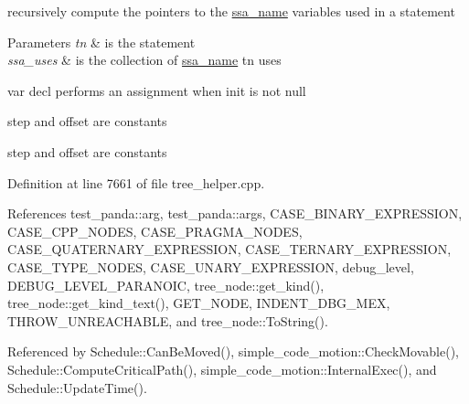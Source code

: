 recursively compute the pointers to the \hyperlink{structssa__name}{ssa\+\_\+name} variables used in a statement 


\begin{DoxyParams}{Parameters}
{\em tn} & is the statement \\
\hline
{\em ssa\+\_\+uses} & is the collection of \hyperlink{structssa__name}{ssa\+\_\+name} tn uses \\
\hline
\end{DoxyParams}
var decl performs an assignment when init is not null

step and offset are constants

step and offset are constants 

Definition at line 7661 of file tree\+\_\+helper.\+cpp.



References test\+\_\+panda\+::arg, test\+\_\+panda\+::args, C\+A\+S\+E\+\_\+\+B\+I\+N\+A\+R\+Y\+\_\+\+E\+X\+P\+R\+E\+S\+S\+I\+ON, C\+A\+S\+E\+\_\+\+C\+P\+P\+\_\+\+N\+O\+D\+ES, C\+A\+S\+E\+\_\+\+P\+R\+A\+G\+M\+A\+\_\+\+N\+O\+D\+ES, C\+A\+S\+E\+\_\+\+Q\+U\+A\+T\+E\+R\+N\+A\+R\+Y\+\_\+\+E\+X\+P\+R\+E\+S\+S\+I\+ON, C\+A\+S\+E\+\_\+\+T\+E\+R\+N\+A\+R\+Y\+\_\+\+E\+X\+P\+R\+E\+S\+S\+I\+ON, C\+A\+S\+E\+\_\+\+T\+Y\+P\+E\+\_\+\+N\+O\+D\+ES, C\+A\+S\+E\+\_\+\+U\+N\+A\+R\+Y\+\_\+\+E\+X\+P\+R\+E\+S\+S\+I\+ON, debug\+\_\+level, D\+E\+B\+U\+G\+\_\+\+L\+E\+V\+E\+L\+\_\+\+P\+A\+R\+A\+N\+O\+IC, tree\+\_\+node\+::get\+\_\+kind(), tree\+\_\+node\+::get\+\_\+kind\+\_\+text(), G\+E\+T\+\_\+\+N\+O\+DE, I\+N\+D\+E\+N\+T\+\_\+\+D\+B\+G\+\_\+\+M\+EX, T\+H\+R\+O\+W\+\_\+\+U\+N\+R\+E\+A\+C\+H\+A\+B\+LE, and tree\+\_\+node\+::\+To\+String().



Referenced by Schedule\+::\+Can\+Be\+Moved(), simple\+\_\+code\+\_\+motion\+::\+Check\+Movable(), Schedule\+::\+Compute\+Critical\+Path(), simple\+\_\+code\+\_\+motion\+::\+Internal\+Exec(), and Schedule\+::\+Update\+Time().

